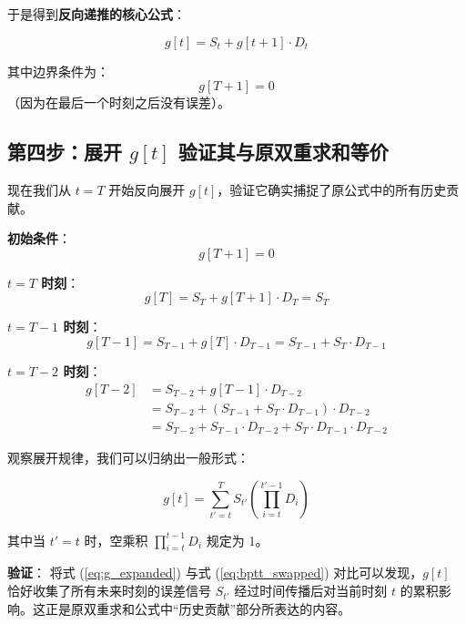 \documentclass[journal,12pt,onecolumn]{IEEEtran}
\begin{document}
于是得到\textbf{反向递推的核心公式}：

\begin{equation}
\boxed{
g[t] = S_t + g[t+1] \cdot D_t
}
\label{eq:g_recursion}
\end{equation}

其中边界条件为：
\begin{equation}
g[T+1] = 0
\end{equation}
（因为在最后一个时刻之后没有误差）。

\subsection{第四步：展开 \(g[t]\) 验证其与原双重求和等价}

现在我们从 \(t=T\) 开始反向展开 \(g[t]\)，验证它确实捕捉了原公式中的所有历史贡献。

\textbf{初始条件}：
\begin{equation}
g[T+1] = 0
\end{equation}

\textbf{\(t=T\) 时刻}：
\begin{equation}
g[T] = S_T + g[T+1] \cdot D_T = S_T
\end{equation}

\textbf{\(t=T-1\) 时刻}：
\begin{equation}
g[T-1] = S_{T-1} + g[T] \cdot D_{T-1} = S_{T-1} + S_T \cdot D_{T-1}
\end{equation}

\textbf{\(t=T-2\) 时刻}：
\begin{equation}
\begin{aligned}
g[T-2] &= S_{T-2} + g[T-1] \cdot D_{T-2} \\
&= S_{T-2} + (S_{T-1} + S_T \cdot D_{T-1}) \cdot D_{T-2} \\
&= S_{T-2} + S_{T-1} \cdot D_{T-2} + S_T \cdot D_{T-1} \cdot D_{T-2}
\end{aligned}
\end{equation}

观察展开规律，我们可以归纳出一般形式：

\begin{equation}
\boxed{
g[t] = \sum_{t'=t}^{T} S_{t'} \left( \prod_{i=t}^{t'-1} D_i \right)
}
\label{eq:g_expanded}
\end{equation}

其中当 \(t' = t\) 时，空乘积 \(\prod_{i=t}^{t-1} D_i\) 规定为 1。

\textbf{验证}：
将式 (\ref{eq:g_expanded}) 与式 (\ref{eq:bptt_swapped}) 对比可以发现，\(g[t]\) 恰好收集了所有未来时刻的误差信号 \(S_{t'}\) 经过时间传播后对当前时刻 \(t\) 的累积影响。这正是原双重求和公式中“历史贡献”部分所表达的内容。
\end{document}
